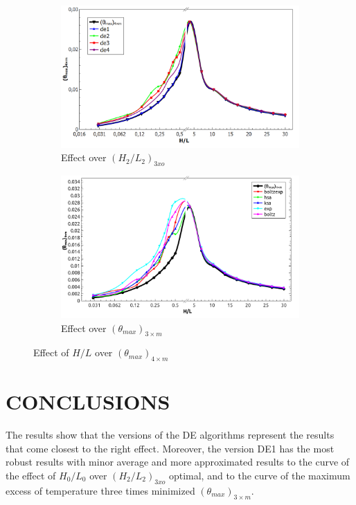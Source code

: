 \documentclass[10pt,fleqn,a4paper,twoside]{article}
\begin{document}
\begin{figure}[h]
\centering
	\begin{subfigure}{0.52\textwidth}
		\centering
		\includegraphics[width=1\linewidth]{imgs/de_300_iter/g_hl_tmim_1.png}
		\caption{ {\small Effect over $(H_{2}/L_{2})_{3xo}$}}
		\label{figure03:sub1}
	\end{subfigure}%
	\begin{subfigure}{0.52\textwidth}
		\centering
		\includegraphics[width=1\linewidth]{imgs/sa_c_300_iter/g_hl_tmim_1.png}
		\caption{ {\small Effect over $({\theta}_{max})_{3\times m}$}}
		\label{figure03:sub2}
	\end{subfigure}%
\caption{Effect of $H/L$ over $({\theta}_{max})_{4\times m}$}
\label{figure03}
\end{figure}

\section{CONCLUSIONS}

The results show that the versions of the DE algorithms represent the results that come closest to the right effect. Moreover, the version DE1 has the most robust results with minor average and more approximated results to the curve of the effect of $H_{0}/L_{0}$ over $(H_{2}/L_{2})_{3xo}$ optimal, and to the curve of the maximum excess of temperature three times minimized $({\theta}_{max})_{3\times m}$.
\end{document}
